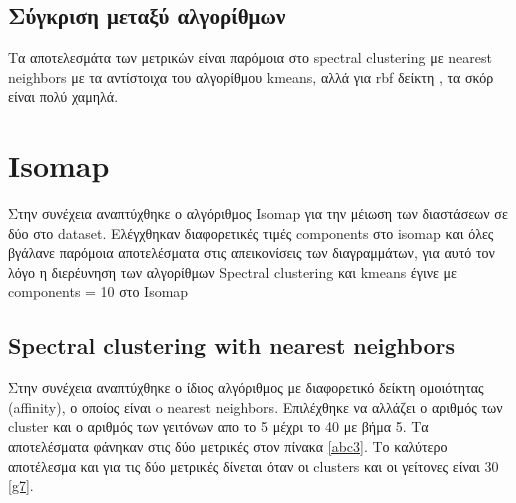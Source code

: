 \subsection{Σύγκριση μεταξύ αλγορίθμων}
Τα αποτελεσμάτα των μετρικών είναι παρόμοια στο spectral clustering με nearest neighbors με τα αντίστοιχα του αλγορίθμου kmeans, αλλά για rbf δείκτη , τα σκόρ είναι πολύ χαμηλά.
\clearpage
\section{Isomap}
Στην συνέχεια αναπτύχθηκε ο αλγόριθμος Isomap για την μέιωση των διαστάσεων σε δύο στο dataset. Ελέγχθηκαν διαφορετικές τιμές components στο isomap και όλες βγάλανε παρόμοια αποτελέσματα στις απεικονίσεις των διαγραμμάτων, για αυτό τον λόγο η διερέυνηση των αλγορίθμων Spectral clustering και kmeans έγινε με components = 10 στο Isomap




\subsection{Spectral clustering with nearest neighbors}

Στην συνέχεια αναπτύχθηκε ο ίδιος αλγόριθμος με διαφορετικό δείκτη ομοιότητας (affinity), ο οποίος είναι o nearest neighbors. Επιλέχθηκε να αλλάζει ο αριθμός των cluster και ο αριθμός των γειτόνων απο το 5 μέχρι το 40 με βήμα 5. Τα αποτελέσματα φάνηκαν στις δύο μετρικές στον πίνακα \ref{abc3}. Το καλύτερο αποτέλεσμα και για τις δύο μετρικές δίνεται όταν οι clusters και οι γείτονες είναι 30 \ref{g7}.

